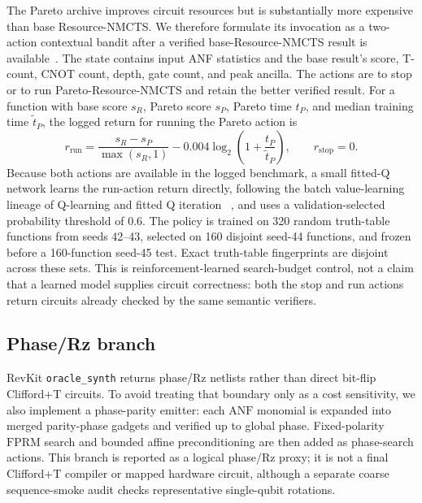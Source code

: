 \documentclass[11pt]{article}
\newcommand{\method}{Resource-NMCTS}
\newcommand{\anf}{\ensuremath{\mathrm{ANF}}}
\newcommand{\fprm}{\ensuremath{\mathrm{FPRM}}}
\begin{document}
The Pareto archive improves circuit resources but is substantially more
expensive than base \method{}.  We therefore formulate its invocation as a
two-action contextual bandit after a verified base-\method{} result is
available~\cite{li2010contextual}.  The state contains input ANF statistics and the base result's
score, T-count, CNOT count, depth, gate count, and peak ancilla.  The actions
are to stop or to run Pareto-\method{} and retain the better verified result.
For a function with base score $s_R$, Pareto score $s_P$, Pareto time $t_P$,
and median training time $\widetilde{t}_P$, the logged return for running the
Pareto action is
\begin{equation}
 r_{\mathrm{run}} = \frac{s_R-s_P}{\max(s_R,1)}
 - 0.004\log_2\!\left(1+\frac{t_P}{\widetilde{t}_P}\right),
 \qquad r_{\mathrm{stop}}=0.
 \label{eq:budget-policy-reward}
\end{equation}
Because both actions are available in the logged benchmark, a small fitted-Q
network learns the run-action return directly, following the batch
value-learning lineage of Q-learning and fitted Q iteration
~\cite{watkins1992qlearning,ernst2005fittedq}, and uses a validation-selected
probability threshold of 0.6.  The policy is trained on 320 random truth-table
functions from seeds 42--43, selected on 160 disjoint seed-44 functions, and
frozen before a 160-function seed-45 test.  Exact truth-table fingerprints are
disjoint across these sets.  This is reinforcement-learned search-budget
control, not a claim that a learned model supplies circuit correctness: both
the stop and run actions return circuits already checked by the same semantic
verifiers.

\subsection{Phase/Rz branch}

RevKit \texttt{oracle\_synth} returns phase/Rz netlists rather than direct
bit-flip Clifford+T circuits.  To avoid treating that boundary only as a cost
sensitivity, we also implement a phase-parity emitter: each \anf{} monomial is
expanded into merged parity-phase gadgets and verified up to global phase.
Fixed-polarity \fprm{} search and bounded affine preconditioning are then added
as phase-search actions.  This branch is reported as a logical phase/Rz proxy;
it is not a final Clifford+T compiler or mapped hardware circuit, although a
separate coarse sequence-smoke audit checks representative single-qubit
rotations.
\end{document}
